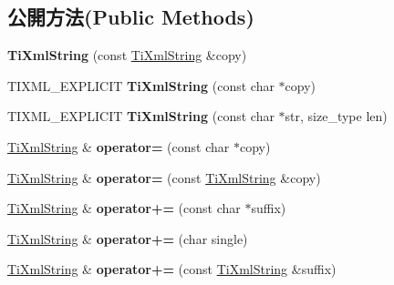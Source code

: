 \subsection*{公開方法(Public Methods)}
\begin{DoxyCompactItemize}
\item 
{\bfseries Ti\+Xml\+String} (const \hyperlink{class_ti_xml_string}{Ti\+Xml\+String} \&copy)\hypertarget{class_ti_xml_string_ac80fe17693a438c9ab2591664743fcb6}{}\label{class_ti_xml_string_ac80fe17693a438c9ab2591664743fcb6}

\item 
T\+I\+X\+M\+L\+\_\+\+E\+X\+P\+L\+I\+C\+IT {\bfseries Ti\+Xml\+String} (const char $\ast$copy)\hypertarget{class_ti_xml_string_aa3b32bd2891a757c9f36c21db44c81d2}{}\label{class_ti_xml_string_aa3b32bd2891a757c9f36c21db44c81d2}

\item 
T\+I\+X\+M\+L\+\_\+\+E\+X\+P\+L\+I\+C\+IT {\bfseries Ti\+Xml\+String} (const char $\ast$str, size\+\_\+type len)\hypertarget{class_ti_xml_string_a4b17ea5c5db986f14827223dfa8f1547}{}\label{class_ti_xml_string_a4b17ea5c5db986f14827223dfa8f1547}

\item 
\hyperlink{class_ti_xml_string}{Ti\+Xml\+String} \& {\bfseries operator=} (const char $\ast$copy)\hypertarget{class_ti_xml_string_ae0bc6147afc0ec2aa0da3a3c0a8fcfb0}{}\label{class_ti_xml_string_ae0bc6147afc0ec2aa0da3a3c0a8fcfb0}

\item 
\hyperlink{class_ti_xml_string}{Ti\+Xml\+String} \& {\bfseries operator=} (const \hyperlink{class_ti_xml_string}{Ti\+Xml\+String} \&copy)\hypertarget{class_ti_xml_string_ab1f1f5d3eceaa0f22d0a7e6055ea81b0}{}\label{class_ti_xml_string_ab1f1f5d3eceaa0f22d0a7e6055ea81b0}

\item 
\hyperlink{class_ti_xml_string}{Ti\+Xml\+String} \& {\bfseries operator+=} (const char $\ast$suffix)\hypertarget{class_ti_xml_string_ab56336ac2aa2a08d24a71eb9a2b502a5}{}\label{class_ti_xml_string_ab56336ac2aa2a08d24a71eb9a2b502a5}

\item 
\hyperlink{class_ti_xml_string}{Ti\+Xml\+String} \& {\bfseries operator+=} (char single)\hypertarget{class_ti_xml_string_a6aa09d5240470b76d54ec709e04f8c13}{}\label{class_ti_xml_string_a6aa09d5240470b76d54ec709e04f8c13}

\item 
\hyperlink{class_ti_xml_string}{Ti\+Xml\+String} \& {\bfseries operator+=} (const \hyperlink{class_ti_xml_string}{Ti\+Xml\+String} \&suffix)\hypertarget{class_ti_xml_string_afdcae5ea2b4d9e194dc21226b817f417}{}\label{class_ti_xml_string_afdcae5ea2b4d9e194dc21226b817f417}


\end{DoxyCompactItemize}
